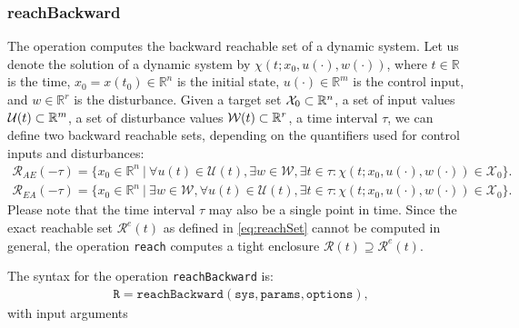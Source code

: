 \subsubsection{reachBackward} \label{sec:reachBackward}

The operation  computes the backward reachable set of a dynamic system. Let us denote the solution of a dynamic system by $\chi(t;x_0,u(\cdot),w(\cdot))$, where $t\in\mathbb{R}$ is the time, $x_0 = x(t_0) \in \mathbb{R}^n$ is the initial state, $u(\cdot) \in \mathbb{R}^m$ is the control input, and $w \in \mathbb{R}^r$ is the disturbance.
Given a target set $\mathcal{X}_0 \subset \mathbb{R}^n$, a set of input values $\mathcal{U}(t) \subset \mathbb{R}^m$, a set of disturbance values $\mathcal{W}(t) \subset \mathbb{R}^r$, a time interval $\tau$, we can define two backward reachable sets, depending on the quantifiers used for control inputs and disturbances:
\begin{align}
  \mathcal{R}_{AE}(-\tau) = \Big\{ x_0 \in \mathbb{R}^n ~\big|~ \forall u(t)\in\mathcal{U}(t), \exists w \in \mathcal{W}, \exists t \in \tau\colon \chi(t;x_0,u(\cdot),w(\cdot)) \in \mathcal{X}_0 \Big\}.
  \label{eq:reachBackward_AE} \\
  \mathcal{R}_{EA}(-\tau) = \Big\{ x_0 \in \mathbb{R}^n ~\big|~ \exists w \in \mathcal{W}, \forall u(t)\in\mathcal{U}(t), \exists t \in \tau\colon \chi(t;x_0,u(\cdot),w(\cdot)) \in \mathcal{X}_0 \Big\}.
  \label{eq:reachBackward_EA}
\end{align}
Please note that the time interval $\tau$ may also be a single point in time.
Since the exact reachable set $\mathcal{R}^e(t)$ as defined in \eqref{eq:reachSet} cannot be computed in general, the operation \texttt{reach} computes a tight enclosure $\mathcal{R}(t) \supseteq \mathcal{R}^e(t)$.

The syntax for the operation \texttt{reachBackward} is:
\begin{equation*}
\begin{split}
	& \texttt{R} = \texttt{reachBackward}(\texttt{sys},\texttt{params},\texttt{options}) ,
\end{split}
\end{equation*}
with input arguments

